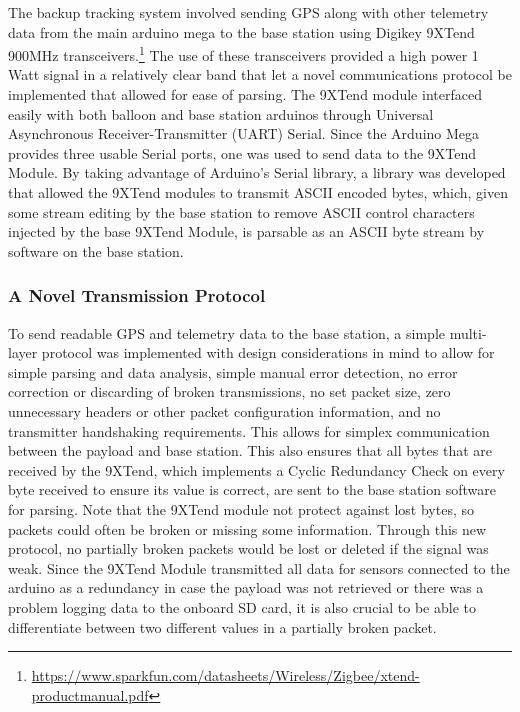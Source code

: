 \documentclass[12pt,]{article}
\let\rmarkdownfootnote\footnote%
\def\footnote{\protect\rmarkdownfootnote}
\begin{document}
The backup tracking system involved sending GPS along with other
telemetry data from the main arduino mega to the base station using
Digikey 9XTend 900MHz transceivers.\footnote{\url{https://www.sparkfun.com/datasheets/Wireless/Zigbee/xtend-productmanual.pdf}}
The use of these transceivers provided a high power 1 Watt signal in a
relatively clear band that let a novel communications protocol be
implemented that allowed for ease of parsing. The 9XTend module
interfaced easily with both balloon and base station arduinos through
Universal Asynchronous Receiver-Transmitter (UART) Serial. Since the
Arduino Mega provides three usable Serial ports, one was used to send
data to the 9XTend Module. By taking advantage of Arduino's Serial
library, a library was developed that allowed the 9XTend modules to
transmit ASCII encoded bytes, which, given some stream editing by the
base station to remove ASCII control characters injected by the base
9XTend Module, is parsable as an ASCII byte stream by software on the
base station.

\subsubsection{A Novel Transmission
Protocol}\label{a-novel-transmission-protocol}

To send readable GPS and telemetry data to the base station, a simple
multi-layer protocol was implemented with design considerations in mind
to allow for simple parsing and data analysis, simple manual error
detection, no error correction or discarding of broken transmissions, no
set packet size, zero unnecessary headers or other packet configuration
information, and no transmitter handshaking requirements. This allows
for simplex communication between the payload and base station. This
also ensures that all bytes that are received by the 9XTend, which
implements a Cyclic Redundancy Check on every byte received to ensure
its value is correct, are sent to the base station software for parsing.
Note that the 9XTend module not protect against lost bytes, so packets
could often be broken or missing some information. Through this new
protocol, no partially broken packets would be lost or deleted if the
signal was weak. Since the 9XTend Module transmitted all data for
sensors connected to the arduino as a redundancy in case the payload was
not retrieved or there was a problem logging data to the onboard SD
card, it is also crucial to be able to differentiate between two
different values in a partially broken packet.
\end{document}

